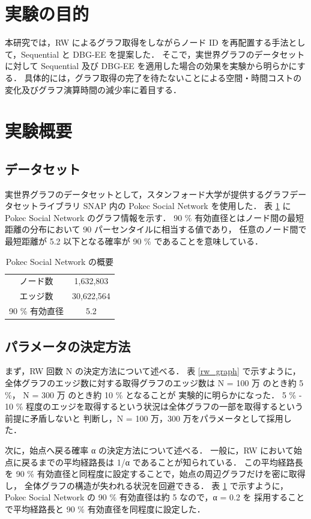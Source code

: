 \section{実験の目的}
本研究では，RW によるグラフ取得をしながらノード ID を再配置する手法として，Sequential と DBG-EE を提案した．
そこで，実世界グラフのデータセットに対して Sequential 及び DBG-EE を適用した場合の効果を実験から明らかにする．
具体的には，グラフ取得の完了を待たないことによる空間・時間コストの変化及びグラフ演算時間の減少率に着目する．
\section{実験概要}
\subsection{データセット}
実世界グラフのデータセットとして，スタンフォード大学が提供するグラフデータセットライブラリ SNAP \cite{snapnets} 内の 
Pokec Social Network \cite{takac2012data} を使用した．
表 \ref{dataset} に Pokec Social Network のグラフ情報を示す．
90 \% 有効直径とはノード間の最短距離の分布において 90 パーセンタイルに相当する値であり，
任意のノード間で最短距離が 5.2 以下となる確率が 90 \% であることを意味している．
\begin{table}[t]
  \begin{center}
    \caption{Pokec Social Network の概要}
    \begin{tabular}{cc} \toprule
      ノード数 & 1,632,803 \\
      エッジ数 & 30,622,564 \\
      90 \% 有効直径 & 5.2 \\ \bottomrule
    \end{tabular}
    \label{dataset}
  \end{center}
\end{table}

\subsection{パラメータの決定方法}
まず，RW 回数 N の決定方法について述べる．
表 \ref{rw_graph} で示すように，全体グラフのエッジ数に対する取得グラフのエッジ数は N = 100 万 のとき約 5 \%， N = 300 万 のとき約 10 \% となることが
実験的に明らかになった．
5 \% - 10 \% 程度のエッジを取得するという状況は全体グラフの一部を取得するという前提に矛盾しないと
判断し，N = 100 万，300 万をパラメータとして採用した．

次に，始点へ戻る確率 α の決定方法について述べる．
一般に，RW において始点に戻るまでの平均経路長は 1/α であることが知られている．
この平均経路長を 90 \% 有効直径と同程度に設定することで，始点の周辺グラフだけを密に取得し，
全体グラフの構造が失われる状況を回避できる．
表 \ref{dataset} で示すように，Pokec Social Network の 90 \% 有効直径は約 5 なので，α = 0.2 を
採用することで平均経路長と 90 \% 有効直径を同程度に設定した． 

